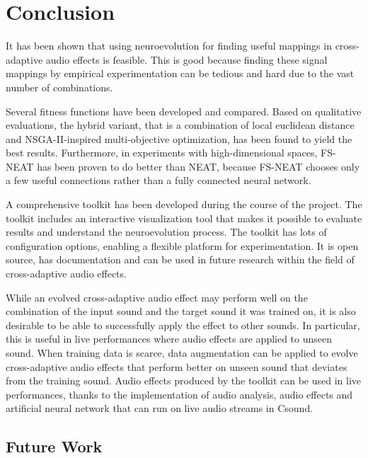 \chapter{Conclusion}
\label{chapter:conclusion}

It has been shown that using neuroevolution for finding useful mappings in cross-adaptive audio effects is feasible. This is good because finding these signal mappings by empirical experimentation can be tedious and hard due to the vast number of combinations.

Several fitness functions have been developed and compared. Based on qualitative evaluations, the hybrid variant, that is a combination of local euclidean distance and NSGA-II-inspired multi-objective optimization, has been found to yield the best results. Furthermore, in experiments with high-dimensional spaces, FS-NEAT has been proven to do better than NEAT, because FS-NEAT chooses only a few useful connections rather than a fully connected neural network.

A comprehensive toolkit has been developed during the course of the project. The toolkit includes an interactive visualization tool that makes it possible to evaluate results and understand the neuroevolution process. The toolkit has lots of configuration options, enabling a flexible platform for experimentation. It is open source, has documentation and can be used in future research within the field of cross-adaptive audio effects.

While an evolved cross-adaptive audio effect may perform well on the combination of the input sound and the target sound it was trained on, it is also desirable to be able to successfully apply the effect to other sounds. In particular, this is useful in live performances where audio effects are applied to unseen sound. When training data is scarce, data augmentation can be applied to evolve cross-adaptive audio effects that perform better on unseen sound that deviates from the training sound. Audio effects produced by the toolkit can be used in live performances, thanks to the implementation of audio analysis, audio effects and artificial neural network that can run on live audio streams in Csound.

\section{Future Work}

